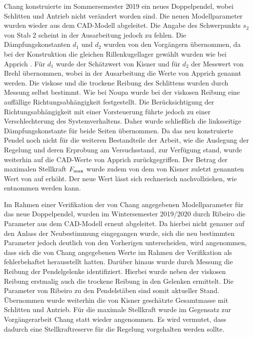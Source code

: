 Chang \cite{chang} konstruierte im Sommersemester 2019 ein neues Doppelpendel, wobei Schlitten und Antrieb nicht verändert worden sind. Die neuen Modellparameter wurden wieder aus dem CAD-Modell abgeleitet. Die Angabe des Schwerpunkts $s_2$ von Stab 2 scheint in der Ausarbeitung jedoch zu fehlen. Die Dämpfungskonstanten $d_1$ und $d_2$ wurden von den Vorgängern übernommen, da bei der Konstruktion die gleichen Rillenkugellager gewählt wurden wie bei Apprich \cite{apprich}. Für $d_1$ wurde der Schätzwert von Kisner \cite{kisner} und für $d_2$ der Messwert von Brehl \cite{brehl} übernommen, wobei in der Ausarbeitung die Werte von Apprich \cite{apprich} genannt werden. Die viskose und die trockene Reibung des Schlittens wurden durch Messung selbst bestimmt. Wie bei Noupa \cite{noupa} wurde bei der viskosen Reibung eine auffällige Richtungsabhängigkeit festgestellt. Die Berücksichtigung der Richtungsabhängigkeit mit einer Vorsteuerung führte jedoch zu einer Verschlechterung des Systemverhaltens. Daher wurde schließlich die linksseitige Dämpfungskonstante für beide Seiten übernommen. Da das neu konstruierte Pendel noch nicht für die weiteren Bestandteile der Arbeit, wie die Auslegung der Regelung und deren Erprobung am Versuchsstand, zur Verfügung stand, wurde weiterhin auf die CAD-Werte von Apprich \cite{apprich} zurückgegriffen. Der Betrag der maximalen Stellkraft $F_{\mathrm{max}}$ wurde zudem von dem von Kisner \cite{kisner} zuletzt genannten Wert von  auf  erhöht. Der neue Wert lässt sich rechnerisch nachvollziehen, wie  entnommen werden kann.

Im Rahmen einer Verifikation der von Chang \cite{chang} angegebenen Modellparameter für das neue Doppelpendel, wurden im Wintersemester 2019/2020 durch Ribeiro \cite{ribeiro} die Parameter aus dem CAD-Modell erneut abgeleitet. Da hierbei nicht genauer auf den Anlass der Neubestimmung eingegangen wurde, sich die neu bestimmten Parameter jedoch deutlich von den Vorherigen unterscheiden, wird angenommen, dass sich die von Chang \cite{chang} angegebenen Werte im Rahmen der Verifikation als fehlerbehaftet herausstellt hatten. 
Darüber hinaus wurde durch Messung die Reibung der Pendelgelenke identifiziert. Hierbei wurde neben der viskosen Reibung erstmalig auch die trockene Reibung in den Gelenken ermittelt. Die Parameter von Ribeiro \cite{ribeiro} zu den Pendelstäben sind somit aktueller Stand. Übernommen wurde weiterhin die von Kisner \cite{kisner} geschätzte Gesamtmasse mit Schlitten und Antrieb. Für die maximale Stellkraft wurde im Gegensatz zur Vorgängerarbeit Chang \cite{chang} statt  wieder  angenommen. Es wird vermutet, dass dadurch eine Stellkraftreserve für die Regelung vorgehalten werden sollte.


